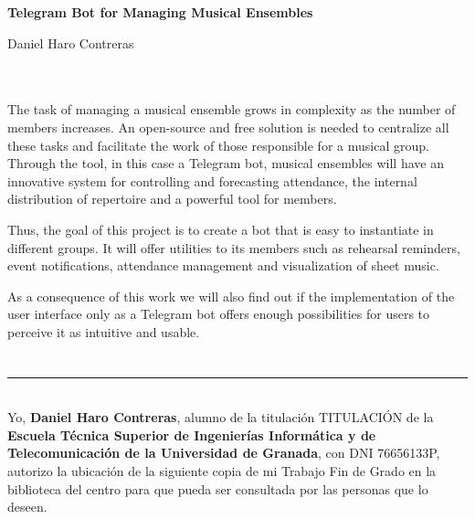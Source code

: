\cleardoublepage


\thispagestyle{empty}


\begin{center}
{\large\bfseries Telegram Bot for Managing Musical Ensembles}\\
\end{center}
\begin{center}
Daniel Haro Contreras\\
\end{center}

\\

\vspace{0.7cm}
\\

The task of managing a musical ensemble grows in complexity as the number of members increases. An open-source and free solution is needed to centralize all these tasks and facilitate the work of those responsible for a musical group. Through the tool, in this case a Telegram bot, musical ensembles will have an innovative system for controlling and forecasting attendance, the internal distribution of repertoire and a powerful tool for members.

Thus, the goal of this project is to create a bot that is easy to instantiate in different groups. It will offer utilities to its members such as rehearsal reminders, event notifications, attendance management and visualization of sheet music.

As a consequence of this work we will also find out if the implementation of the user interface only as a Telegram bot offers enough possibilities for users to perceive it as intuitive and usable.

\chapter*{}
\thispagestyle{empty}

\noindent\rule[-1ex]{\textwidth}{2pt}\\[4.5ex]

Yo, \textbf{Daniel Haro Contreras}, alumno de la titulación TITULACIÓN de la \textbf{Escuela Técnica Superior
de Ingenierías Informática y de Telecomunicación de la Universidad de Granada}, con DNI 76656133P, autorizo la
ubicación de la siguiente copia de mi Trabajo Fin de Grado en la biblioteca del centro para que pueda ser
consultada por las personas que lo deseen.

